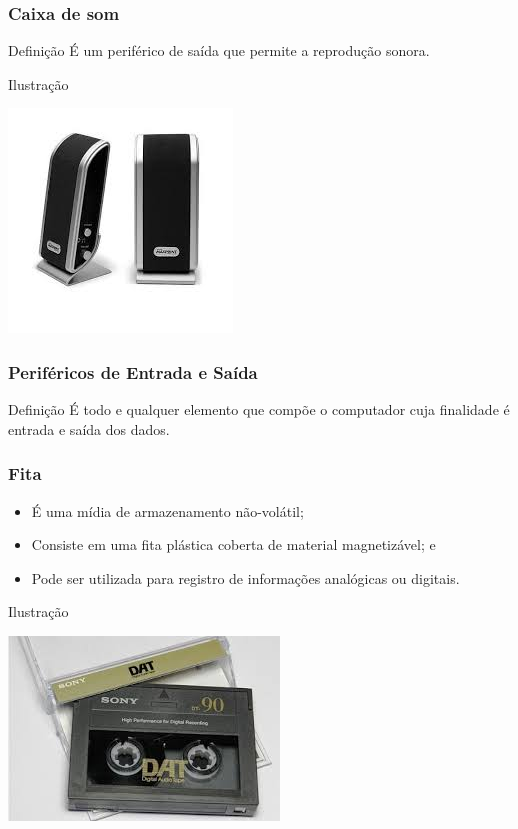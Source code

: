 \documentclass[aspectratio=169]{beamer} %
\begin{document}
\begin{frame}
	\frametitle{Caixa de som}
	
	\begin{block}{Defini\c cão}
		É um periférico de saída que permite a reprodução sonora.
	\end{block}\vfill
	
	\begin{exampleblock}{Ilustra\c cão}
		\begin{center}
			\includegraphics[scale=0.5]{img/caixa-de-som}
		\end{center}		
	\end{exampleblock}
\end{frame}


\begin{frame}
	\frametitle{Periféricos de Entrada e Saída}
	
	\begin{block}{Defini\c cão}
		É todo e qualquer elemento que compõe o computador cuja finalidade é entrada e saída dos dados.
	\end{block}
\end{frame}

\begin{frame}
	\frametitle{Fita}
		
	\begin{itemize}
		\item É uma mídia de armazenamento não-volátil;
		\item Consiste em uma fita plástica coberta de material magnetizável; e 
		\item Pode ser utilizada para registro de informações analógicas ou digitais.
	\end{itemize}\vfill
	
	\begin{exampleblock}{Ilustra\c cão}
		\begin{center}
			\includegraphics[scale=0.4]{img/fita_dat}
		\end{center}		
	\end{exampleblock}
\end{frame}
\end{document}
